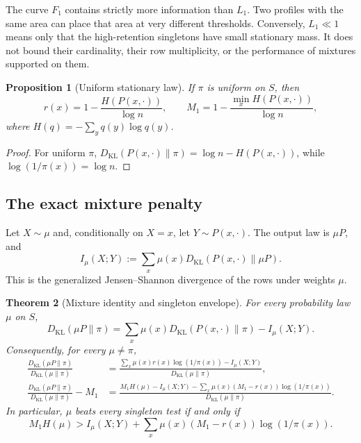 \documentclass[11pt]{article}
\newtheorem{theorem}{Theorem}[section]
\newtheorem{proposition}[theorem]{Proposition}
\newcommand{\KL}{D_{\mathrm{KL}}}
\newcommand{\Mone}{M_1}
\newcommand{\Lone}{L_1}
\begin{document}
The curve \(F_1\) contains strictly more information than \(\Lone\).
Two profiles with the same area can place that area at very different
thresholds.  Conversely, \(\Lone\ll1\) means only that the high-retention
singletons have small stationary mass.  It does not bound their cardinality,
their row multiplicity, or the performance of mixtures supported on them.

\begin{proposition}[Uniform stationary law]
\label{prop:uniform-entropy}
If \(\pi\) is uniform on \(S\), then
\[
  r(x)=1-\frac{H(P(x,\cdot))}{\log n},
  \qquad
  \Mone=1-\frac{\min_x H(P(x,\cdot))}{\log n},
\]
where \(H(q)=-\sum_yq(y)\log q(y)\).
\end{proposition}

\begin{proof}
For uniform \(\pi\),
\(\KL(P(x,\cdot)\|\pi)=\log n-H(P(x,\cdot))\), while
\(\log(1/\pi(x))=\log n\).
\end{proof}

\subsection{The exact mixture penalty}

Let \(X\sim\mu\) and, conditionally on \(X=x\), let
\(Y\sim P(x,\cdot)\).  The output law is \(\mu P\), and
\[
  I_\mu(X;Y)
  :=\sum_x\mu(x)\KL(P(x,\cdot)\|\mu P).
\]
This is the generalized Jensen--Shannon divergence of the rows under
weights \(\mu\).

\begin{theorem}[Mixture identity and singleton envelope]
\label{thm:mixture-identity}
For every probability law \(\mu\) on \(S\),
\begin{equation}
  \KL(\mu P\|\pi)
  =
  \sum_x\mu(x)\KL(P(x,\cdot)\|\pi)-I_\mu(X;Y).
  \label{eq:mixture-identity}
\end{equation}
Consequently, for every \(\mu\ne\pi\),
\begin{align}
  \frac{\KL(\mu P\|\pi)}{\KL(\mu\|\pi)}
  &=
  \frac{\sum_x\mu(x)r(x)\log(1/\pi(x))-I_\mu(X;Y)}
       {\KL(\mu\|\pi)},                                      \label{eq:exact-envelope}\\
  \frac{\KL(\mu P\|\pi)}{\KL(\mu\|\pi)}-\Mone
  &=
  \frac{
    \Mone H(\mu)-I_\mu(X;Y)
    -\sum_x\mu(x)(\Mone-r(x))\log(1/\pi(x))
  }{\KL(\mu\|\pi)}.                                         \label{eq:beat-singleton}
\end{align}
In particular, \(\mu\) beats every singleton test if and only if
\[
  \Mone H(\mu)>
  I_\mu(X;Y)
  +\sum_x\mu(x)(\Mone-r(x))\log(1/\pi(x)).
\]
\end{theorem}
\end{document}
